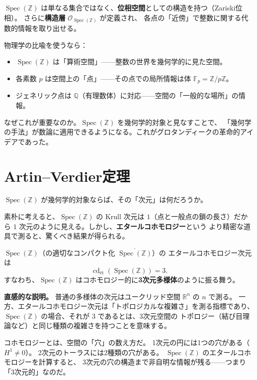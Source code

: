 \documentclass[11pt,a4paper]{article}
\theoremstyle{definition}
\newcommand{\Z}{\mathbb{Z}}
\newcommand{\Q}{\mathbb{Q}}
\newcommand{\R}{\mathbb{R}}
\newcommand{\Spec}{\operatorname{Spec}}
\newcommand{\cd}{\operatorname{cd}}
\begin{document}
$\Spec(\Z)$ は単なる集合ではなく、\textbf{位相空間}としての構造を持つ（Zariski位相）。
さらに\textbf{構造層} $\mathcal{O}_{\Spec(\Z)}$ が定義され、
各点の「近傍」で整数に関する代数的情報を取り出せる。

物理学の比喩を使うなら：
\begin{itemize}
  \item $\Spec(\Z)$ は「算術空間」——整数の世界を幾何学的に見た空間。
  \item 各素数 $p$ は空間上の「点」——その点での局所情報は体 $\mathbb{F}_p = \Z/p\Z$。
  \item ジェネリック点は $\Q$（有理数体）に対応——空間の「一般的な場所」の情報。
\end{itemize}

なぜこれが重要なのか。$\Spec(\Z)$ を幾何学的対象と見なすことで、
「幾何学の手法」が数論に適用できるようになる。これがグロタンディークの革命的アイデアであった。

\section{Artin--Verdier定理}
\label{sec:1.4}

$\Spec(\Z)$ が幾何学的対象ならば、その「次元」は何だろうか。

素朴に考えると、$\Spec(\Z)$ の Krull 次元は $1$（点と一般点の鎖の長さ）だから
$1$ 次元のように見える。しかし、\textbf{エタールコホモロジー}という
より精密な道具で測ると、驚くべき結果が得られる。

\begin{keybox}
$\Spec(\Z)$（の適切なコンパクト化 $\overline{\Spec(\Z)}$）の
エタールコホモロジー次元は
\[
  \cd_{\text{\'et}}(\Spec(\Z)) = 3.
\]
すなわち、$\Spec(\Z)$ はコホモロジー的に\textbf{3次元多様体}のように振る舞う。
\end{keybox}

\noindent\textbf{直感的な説明。}
普通の多様体の次元はユークリッド空間 $\R^n$ の $n$ で測る。
一方、エタールコホモロジー次元は「トポロジカルな複雑さ」を測る指標であり、
$\Spec(\Z)$ の場合、それが $3$ であるとは、$3$次元空間の
トポロジー（結び目理論など）と同じ種類の複雑さを持つことを意味する。

\begin{hsbox}
コホモロジーとは、空間の「穴」の数え方だ。
1次元の円には1つの穴がある（$H^1 \neq 0$）。
2次元のトーラスには2種類の穴がある。
$\Spec(\Z)$ のエタールコホモロジーを計算すると、
$3$次元の穴の構造まで非自明な情報が残る——つまり「3次元的」なのだ。
\end{hsbox}
\end{document}
